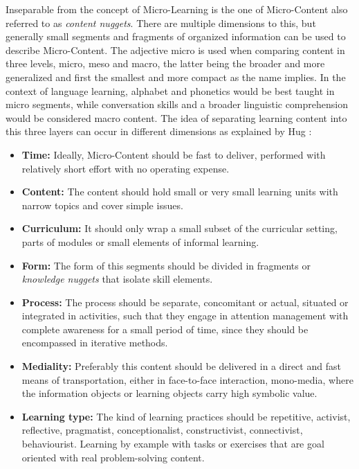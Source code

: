 Inseparable from the concept of Micro-Learning is the one of Micro-Content also referred to as
\textit{content nuggets}. There are 
multiple dimensions to this, but generally small segments and fragments of organized
information can be used to describe Micro-Content.
The adjective micro is used when comparing content in three levels, micro, meso and
macro, the latter being the broader and more generalized and first the smallest and 
more compact as the name implies. In the context of language learning, alphabet and
phonetics would be best taught in micro segments, while conversation skills and 
a broader linguistic comprehension would be considered macro content.
The idea of separating learning content into this three layers can occur in different
dimensions as explained by Hug \cite{microlearningdimensions}:

\begin{itemize}
    \item \textbf{Time:} 
        Ideally, Micro-Content should be fast to deliver, performed with relatively
        short effort with no operating expense.
    \item \textbf{Content:} The content should hold small or very small learning units
        with narrow topics and cover simple issues.
    \item \textbf{Curriculum:} 
        It should only wrap a small subset of the curricular setting, parts of modules
        or small elements of informal learning.
    \item \textbf{Form:} 
        The form of this segments should be divided in fragments or 
        \textit{knowledge nuggets} that isolate skill elements.
    \item \textbf{Process:} The process should be
        separate, concomitant or actual, situated or integrated in activities, such
        that they engage in attention management with complete awareness for a small
        period of time, since they should be encompassed in iterative methods.
    \item \textbf{Mediality:} 
        Preferably this content should be delivered in a direct and fast means of
        transportation, either in face-to-face interaction, mono-media, where the
        information objects or learning objects carry high symbolic value.
    \item \textbf{Learning type:} 
        The kind of learning practices should be repetitive, activist, 
        reflective, pragmatist, 
        conceptionalist, 
        constructivist, connectivist, behaviourist. Learning by example with tasks
        or exercises that are goal oriented with real problem-solving content.
\end{itemize}


